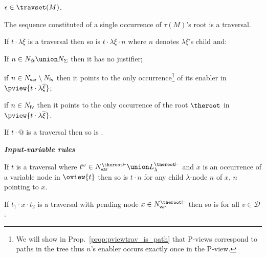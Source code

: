 \begin{FramedTable}
\begin{description}
\item{} $\epsilon \in \travset(M)$.
\item{} The sequence constituted of a single occurrence of $\tau(M)$'s root is a traversal.
\end{description}

\begin{description}
    \item {} If $t \cdot \lambda \overline{\xi}$ is a traversal then so is
        $t \cdot \lambda \overline{\xi} \cdot n$ where $n$ denotes
        $\lambda \overline{\xi}$'s child and:
        \begin{compactitem}
            \item If $n \in N_@ \union N_\Sigma$ then it has no justifier;
            \item if  $n \in N_{\sf var}\setminus N_{\sf fv}$ then it points to the only occurrence\footnote{We will show in
            Prop.\ \ref{prop:pviewtrav_is_path} that P-views correspond to
            paths in the tree thus $n$'s enabler occurs exactly once in the
            P-view.} of its enabler in
            $\pview{t\cdot \lambda \overline{\xi}}$;
            \item if  $n \in N_{\sf fv}$ then it points
            to the only occurrence of the root $\theroot$ in
            $\pview{t \cdot \lambda \overline{\xi}}$.
        \end{compactitem}
    \item {} If $t \cdot @$ is a traversal then so is .
\end{description}

\emph{\bf Input-variable rules}
\begin{description}
\item {} If $t$ is a traversal where $t^\omega \in N_{\sf var}^{\theroot\vdash} \union L_\lambda^{\theroot\vdash}$
and $x$ is an occurrence of a variable node in $\oview{t}$ then so is $t \cdot n$ for any child $\lambda$-node $n$ of $x$, $n$ pointing to $x$.



\item {} If $t_1
\cdot x \cdot t_2$ is a traversal with pending node $x \in
N_{\sf var}^{\theroot\vdash}$ then so is  for all $v \in
\mathcal{D}$.
\end{description}


\end{FramedTable}
